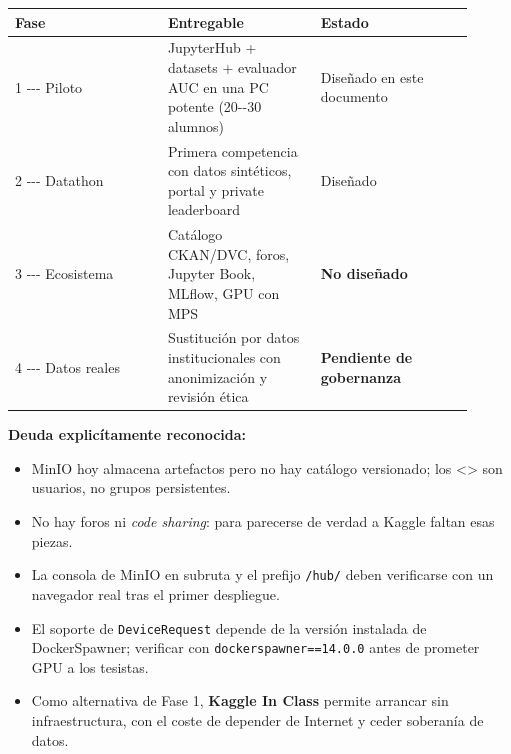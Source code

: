 \documentclass[11pt,a4paper]{article}
\providecommand{\tightlist}{%
  \setlength{\itemsep}{0pt}\setlength{\parskip}{0pt}}
\begin{document}
\begin{longtable}[]{@{}p{0.302\linewidth}p{0.302\linewidth}p{0.302\linewidth}@{}}
\toprule
Fase & Entregable & Estado \\
\midrule
\endhead
1 -\/-\/- Piloto & JupyterHub + datasets + evaluador AUC en una PC potente (20-\/-30 alumnos) & Diseñado en este documento \\
2 -\/-\/- Datathon & Primera competencia con datos sintéticos, portal y private leaderboard & Diseñado \\
3 -\/-\/- Ecosistema & Catálogo CKAN/DVC, foros, Jupyter Book, MLflow, GPU con MPS & \textbf{No diseñado} \\
4 -\/-\/- Datos reales & Sustitución por datos institucionales con anonimización y revisión ética & \textbf{Pendiente de gobernanza} \\
\bottomrule
\end{longtable}

\textbf{Deuda explicítamente reconocida:}

\begin{itemize}
\tightlist
\item
  MinIO hoy almacena artefactos pero no hay catálogo versionado; los \textless{}\textgreater{} son usuarios, no grupos persistentes.
\item
  No hay foros ni \emph{code sharing}: para parecerse de verdad a Kaggle faltan esas piezas.
\item
  La consola de MinIO en subruta y el prefijo \texttt{/\allowbreak{}hub/\allowbreak{}} deben verificarse con un navegador real tras el primer despliegue.
\item
  El soporte de \texttt{DeviceRequest} depende de la versión instalada de DockerSpawner; verificar con \texttt{dockerspawner==14.\allowbreak{}0.\allowbreak{}0} antes de prometer GPU a los tesistas.
\item
  Como alternativa de Fase 1, \textbf{Kaggle In Class} permite arrancar sin infraestructura, con el coste de depender de Internet y ceder soberanía de datos.
\end{itemize}
\end{document}
